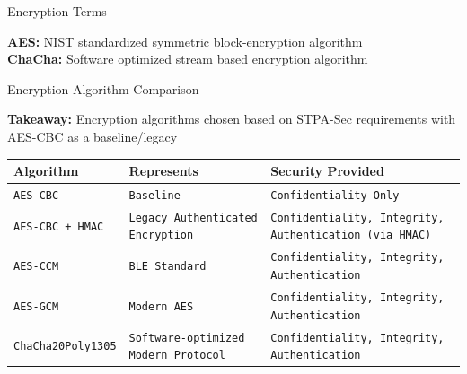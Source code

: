 \documentclass[aspectratio=169]{beamer}
\begin{document}
\begin{frame}{Encryption Terms}
    \begin{alertblock}{}
        \centering
        \textbf{AES: } NIST standardized symmetric block-encryption algorithm\\
        \vspace{.6cm}
        \textbf{ChaCha: } Software optimized stream based encryption algorithm
    \end{alertblock}
    
\end{frame}

\begin{frame}[t]{Encryption Algorithm Comparison}
    \begin{alertblock}{}
        \centering
        \footnotesize \textbf{Takeaway: } Encryption algorithms chosen based on STPA-Sec requirements with AES-CBC as a baseline/legacy
    \end{alertblock}
    \begin{table}[htbp]
    \begin{center}
    \begin{tabularx}{\textwidth}{|X|X|X|}
    \hline
    \textbf{\small Algorithm} & \textbf{\small Represents} & \textbf{\small Security Provided} \\
    \hline
    \texttt{\tiny AES-CBC} & \texttt{\tiny Baseline} & \texttt{\tiny Confidentiality Only} \\
    \hline
    \texttt{\tiny AES-CBC + HMAC} & \texttt{\tiny Legacy Authenticated Encryption} & \texttt{\tiny Confidentiality, Integrity, Authentication (via HMAC)} \\
    \hline
    \texttt{\tiny AES-CCM} & \texttt{\tiny BLE Standard} & \texttt{\tiny Confidentiality, Integrity, Authentication} \\
    \hline
    \texttt{\tiny AES-GCM} & \texttt{\tiny Modern AES} & \texttt{\tiny Confidentiality, Integrity, Authentication} \\
    \hline
    \texttt{\tiny ChaCha20Poly1305} & \texttt{\tiny Software-optimized Modern Protocol} & \texttt{\tiny Confidentiality, Integrity, Authentication} \\
    \hline
    \end{tabularx}
    \end{center}
    
\end{table}
\end{frame}
\end{document}
